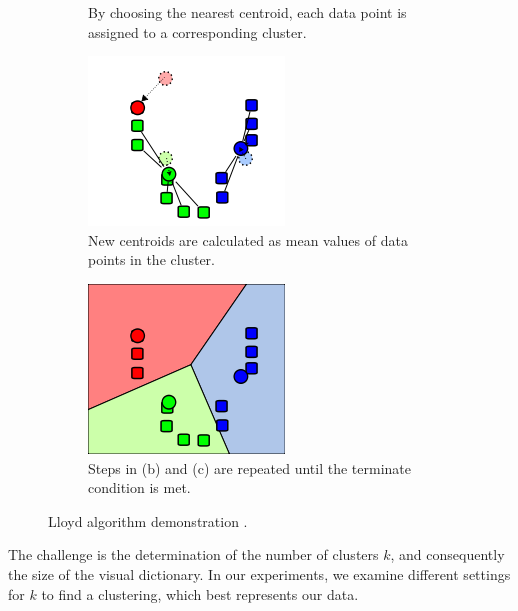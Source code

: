 \begin{figure}[ht]
\begin{subfigure}[t]{0.22\textwidth}
        \caption{By choosing the nearest centroid, each data point is assigned to a corresponding cluster.}
        \label{fig:k-means-alg:assignment_step}
    \end{subfigure}\hfill
    \begin{subfigure}[t]{0.22\textwidth}
        \includegraphics[width=\textwidth]{Figures/k-means/k-means_update_step.png}
        \caption{New centroids are calculated as mean values of data points in the cluster.}
        \label{fig:k-means-alg:update_step}
    \end{subfigure}\hfill
    \begin{subfigure}[t]{0.22\textwidth}
        \includegraphics[width=\textwidth]{Figures/k-means/k-means_assignment_step_2.png}
        \caption{Steps in (b) and (c) are repeated until the terminate condition is met.}
        \label{fig:k-means-alg:assignment_step_2}
    \end{subfigure}\hfill
    \caption[Lloyd's algorithm demonstration.]{Lloyd algorithm demonstration \cite{Wikikmeans}.}
    \label{fig:k_means_alg}
\end{figure}
The challenge is the determination of the number of clusters $k$, and consequently the size of the visual dictionary. In our experiments, we examine different settings for $k$ to find a clustering, which best represents our data.
